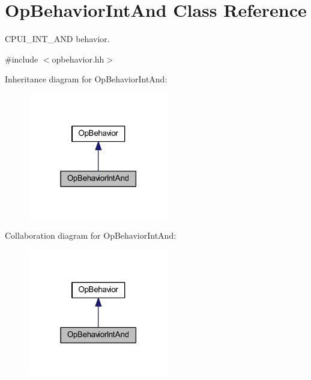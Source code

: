 \hypertarget{class_op_behavior_int_and}{}\section{Op\+Behavior\+Int\+And Class Reference}
\label{class_op_behavior_int_and}


C\+P\+U\+I\+\_\+\+I\+N\+T\+\_\+\+A\+ND behavior.  




{\ttfamily \#include $<$opbehavior.\+hh$>$}



Inheritance diagram for Op\+Behavior\+Int\+And\+:
\nopagebreak
\begin{figure}[H]
\begin{center}
\leavevmode
\includegraphics[width=174pt]{class_op_behavior_int_and__inherit__graph}
\end{center}
\end{figure}


Collaboration diagram for Op\+Behavior\+Int\+And\+:
\nopagebreak
\begin{figure}[H]
\begin{center}
\leavevmode
\includegraphics[width=174pt]{class_op_behavior_int_and__coll__graph}
\end{center}
\end{figure}

